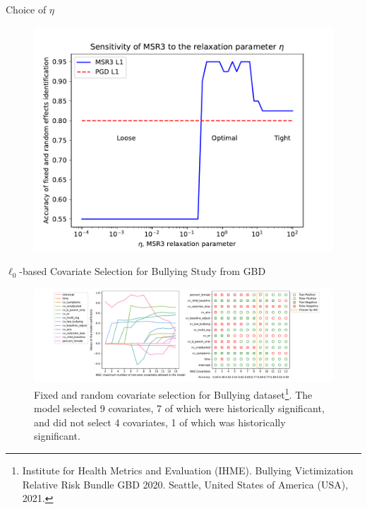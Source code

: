 \documentclass[8pt]{beamer}
\begin{document}
\begin{frame}{Choice of $\eta$}
	\begin{figure}
		\includegraphics[width=\textwidth]{Figures/eta_L1.pdf}
	\end{figure}
\end{frame}

\begin{frame}{$\ell_0$-based Covariate Selection for Bullying Study from GBD}
	\begin{figure}
		\includegraphics[width=\textwidth]{Figures/bullying_data_assessment_selection.pdf}
		\caption{Fixed and random covariate selection for Bullying dataset\footnote{Institute for Health Metrics and Evaluation (IHME). Bullying Victimization Relative Risk Bundle GBD 2020. Seattle, United States of America (USA), 2021.}. The model selected 9 covariates, 7 of which were historically significant, and did not select 4 covariates, 1 of which was historically significant.}
	\end{figure}
\end{frame}
\end{document}
